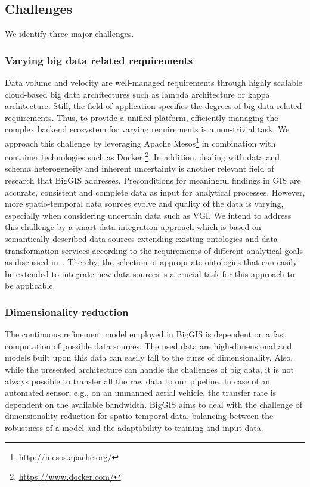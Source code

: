 \documentclass{sig-alternate-05-2015}
\begin{document}
\subsection{Challenges}
\label{sec:chls}
We identify three major challenges.

\subsubsection{Varying big data related requirements}
Data volume and velocity are well-managed requirements through highly
scalable cloud-based big data architectures such as lambda architecture or
kappa architecture. Still, the field of application specifies the degrees of
big data related requirements. Thus, to provide a unified platform, efficiently
managing the complex backend ecosystem for varying requirements is a
non-trivial task. We approach this challenge by leveraging Apache
Mesos\footnote{\url{http://mesos.apache.org/}} in combination with
container technologies such as Docker \footnote{\url{https://www.docker.com/}}.
In addition, dealing with data and schema heterogeneity and
inherent uncertainty is another relevant field of research that BigGIS
addresses. Preconditions for meaningful findings in GIS are accurate,
consistent and complete data as input for analytical processes. However,
more spatio-temporal data sources evolve and quality of the data is
varying, especially when considering uncertain data such as VGI. We intend to
address this challenge by a smart data integration approach which is based on
semantically described data sources extending existing ontologies and data
transformation services according to the requirements of different analytical
goals as discussed in~\cite{Frank.2016a, Frank.2016b}. Thereby, the selection
of appropriate ontologies that can easily be extended to integrate new data
sources is a crucial task for this approach to be applicable.

\subsubsection{Dimensionality reduction}
The continuous refinement model employed in BigGIS is
dependent on a fast computation of possible data sources. The used data are
high-dimensional and models built upon this data can easily fall to the curse
of dimensionality. Also, while the presented architecture can handle the
challenges of big data, it is not always possible to transfer all the raw data
to our pipeline. In case of an automated sensor, e.g., on an unmanned aerial
vehicle, the transfer rate is dependent on the available bandwidth.
BigGIS aims to deal with the challenge of dimensionality reduction for
spatio-temporal data, balancing between the robustness of a model and the
adaptability to training and input data. 
\end{document}
